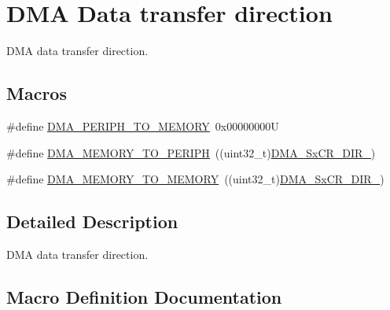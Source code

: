 \hypertarget{group___d_m_a___data__transfer__direction}{}\section{D\+MA Data transfer direction}
\label{group___d_m_a___data__transfer__direction}


D\+MA data transfer direction.  


\subsection*{Macros}
\begin{DoxyCompactItemize}
\item 
\#define \mbox{\hyperlink{group___d_m_a___data__transfer__direction_gacb2cbf03ecae6804ae4a6f60a3e37c12}{D\+M\+A\+\_\+\+P\+E\+R\+I\+P\+H\+\_\+\+T\+O\+\_\+\+M\+E\+M\+O\+RY}}~0x00000000U
\item 
\#define \mbox{\hyperlink{group___d_m_a___data__transfer__direction_ga9e76fc559a2d5c766c969e6e921b1ee9}{D\+M\+A\+\_\+\+M\+E\+M\+O\+R\+Y\+\_\+\+T\+O\+\_\+\+P\+E\+R\+I\+PH}}~((uint32\+\_\+t)\mbox{\hyperlink{group___peripheral___registers___bits___definition_gadca9547536f3d2f76577275964b4875e}{D\+M\+A\+\_\+\+Sx\+C\+R\+\_\+\+D\+I\+R\+\_}})
\item 
\#define \mbox{\hyperlink{group___d_m_a___data__transfer__direction_ga0695035d725855ccf64d2d8452a33810}{D\+M\+A\+\_\+\+M\+E\+M\+O\+R\+Y\+\_\+\+T\+O\+\_\+\+M\+E\+M\+O\+RY}}~((uint32\+\_\+t)\mbox{\hyperlink{group___peripheral___registers___bits___definition_gac52c8d6ecad03bfe531867fa7457f2ae}{D\+M\+A\+\_\+\+Sx\+C\+R\+\_\+\+D\+I\+R\+\_}})
\end{DoxyCompactItemize}


\subsection{Detailed Description}
D\+MA data transfer direction. 



\subsection{Macro Definition Documentation}
\mbox{\label{group___d_m_a___data__transfer__direction_ga0695035d725855ccf64d2d8452a33810}} 

